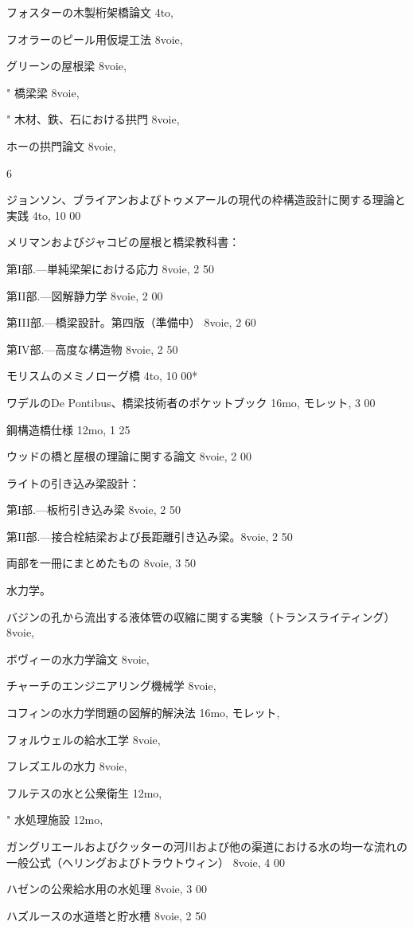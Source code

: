 \documentclass[a4paper,11pt,openany]{ltjsbook}
\begin{document}
フォスターの木製桁架橋論文 4to,

フオラーのピール用仮堤工法 8voie,

グリーンの屋根梁 8voie,

"          橋梁梁 8voie,

"          木材、鉄、石における拱門 8voie,

ホーの拱門論文 8voie,

6

ジョンソン、ブライアンおよびトゥメアールの現代の枠構造設計に関する理論と実践 4to, 10 00

メリマンおよびジャコビの屋根と橋梁教科書：

第I部.—単純梁架における応力 8voie, 2 50

第II部.—図解静力学 8voie, 2 00

第III部.—橋梁設計。第四版（準備中） 8voie, 2 60

第IV部.—高度な構造物 8voie, 2 50

モリスムのメミノローグ橋 4to, 10 00*

ワデルのDe Pontibus、橋梁技術者のポケットブック 16mo, モレット, 3 00

鋼構造橋仕様 12mo, 1 25

ウッドの橋と屋根の理論に関する論文 8voie, 2 00

ライトの引き込み梁設計：

第I部.—板桁引き込み梁 8voie, 2 50

第II部.—接合栓結梁および長距離引き込み梁。8voie, 2 50

両部を一冊にまとめたもの 8voie, 3 50

水力学。

バジンの孔から流出する液体管の収縮に関する実験（トランスライティング） 8voie,

ボヴィーの水力学論文 8voie,

チャーチのエンジニアリング機械学 8voie,

コフィンの水力学問題の図解的解決法 16mo, モレット,

フォルウェルの給水工学 8voie,

フレズエルの水力 8voie,

フルテスの水と公衆衛生 12mo,

"        水処理施設 12mo,

ガングリエールおよびクッターの河川および他の渠道における水の均一な流れの一般公式（ヘリングおよびトラウトウィン） 8voie, 4 00

ハゼンの公衆給水用の水処理 8voie, 3 00

ハズルースの水道塔と貯水槽 8voie, 2 50
\end{document}
